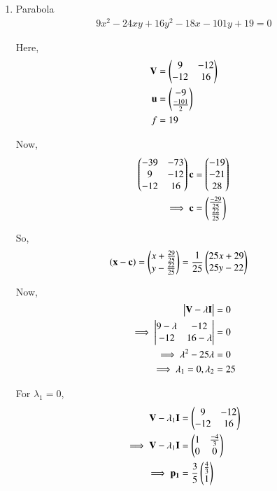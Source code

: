 \begin{enumerate}
    \item Parabola
    \begin{align}
    9x^2-24xy+16y^2-18x-101y+19 = 0
    \end{align}
    
    Here,
    \begin{align}
    \mathbf{V} &= \begin{pmatrix}9 & -12 \\ -12 & 16\end{pmatrix} \\
    \mathbf{u} &= \begin{pmatrix}-9 \\ \frac{-101}{2}\end{pmatrix} \\
    f &= 19
    \end{align}

    Now,
    \begin{align}
    \begin{pmatrix}-39 & -73 \\ 9 & -12 \\ -12 & 16\end{pmatrix}\mathbf{c} &= \begin{pmatrix}-19 \\ -21 \\ 28\end{pmatrix}
    \\
    \implies \mathbf{c} &= \begin{pmatrix}\frac{-29}{25} \\ \frac{22}{25}\end{pmatrix}
    \end{align}
    
    So,
    \begin{align}
    \left(\mathbf{x}-\mathbf{c}\right) &= \begin{pmatrix}x+\frac{29}{25} \\ y-\frac{22}{25}\end{pmatrix}=\frac{1}{25}\begin{pmatrix}25x+29 \\ 25y-22\end{pmatrix}
    \end{align}
    
    Now,
    \begin{align}
        \begin{vmatrix}\mathbf{V}-\lambda\mathbf{I}\end{vmatrix} &= 0 \\
        \implies \begin{vmatrix}9-\lambda & -12 \\ -12 & 16-\lambda\end{vmatrix} &= 0 \\
        \implies \lambda^2-25\lambda &= 0 \\
        \implies \lambda_1 =0,\lambda_2 &= 25
    \end{align}
    
    For $\lambda_1=0$,
    \begin{align}
        \mathbf{V}-\lambda_1\mathbf{I} &= \begin{pmatrix}9 & -12 \\ -12 & 16\end{pmatrix} \\
        \implies \mathbf{V}-\lambda_1\mathbf{I} &= \begin{pmatrix}1 & \frac{-4}{3} \\ 0 & 0\end{pmatrix} \\
        \implies \mathbf{p_1} &=\frac{3}{5}\begin{pmatrix}\frac{4}{3} \\ 1\end{pmatrix}
    \end{align}
    

\end{enumerate}
